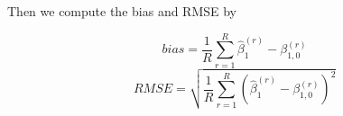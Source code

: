 \documentclass[12pt, a4paper]{article}
\begin{document}
\noindent Then we compute the bias and RMSE by

\begin{equation}
bias =\frac{1}{R}\sum\limits_{r = 1}^R\hat{\beta}_1^{(r)} - \beta_{1,0}^{(r)}
\end{equation}
\begin{equation}
RMSE = \sqrt{\frac{1}{R}\sum\limits_{r=1}^R(\hat{\beta}_1^{(r)} - \beta_{1,0}^{(r)})^2}
\end{equation}

\newpage


\end{document}
